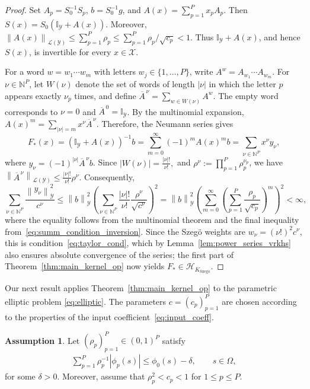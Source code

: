 \documentclass[11pt]{article}
\numberwithin{equation}{section}
\theoremstyle{plain}
\theoremstyle{definition}
\newtheorem{assumption}[theorem]{Assumption}
\theoremstyle{remark}
\newcommand{\X}{\mathcal{X}}
\newcommand{\Hs}{\mathcal{H}}
\newcommand{\Y}{\mathcal{Y}}
\newcommand{\I}{\mathbb{I}}
\newcommand{\norm}[1]{\left\lVert#1\right\rVert}
\newcommand{\abs}[1]{\left|#1\right|}
\begin{document}
\begin{proof}
Set
$A_p=S_0^{-1}S_p$, $b=S_0^{-1}g$, and $A(x)=\sum_{p=1}^P x_pA_p$.
Then
$S(x)=S_0(\I_{\Y}+A(x))$.
Moreover,
$\norm{A(x)}_{\mathcal{L}(\Y)}\leq\sum_{p=1}^P\rho_p\leq\sum_{p=1}^P\rho_p/\sqrt{c_p}<1$.
Thus $\I_{\Y}+A(x)$, and hence $S(x)$, is invertible for every
$x\in\X$.

For a word $w=w_1\cdots w_m$ with letters
$w_j\in\{1,\ldots,P\}$, write
$A^w=A_{w_1}\cdots A_{w_m}$.
For $\nu\in\mathbb{N}^P$, let $W(\nu)$ denote the set of words of length
$|\nu|$ in which the letter $p$ appears exactly $\nu_p$ times, and define
$\overline{A}^{\,\nu}=\sum_{w\in W(\nu)}A^w$.
The empty word corresponds to $\nu=0$ and
$\overline{A}^{\,0}=\I_{\Y}$. By the multinomial expansion,
$A(x)^m=\sum_{|\nu|=m}x^\nu\overline{A}^{\,\nu}$.
Therefore, the Neumann series gives
$$
F_*(x)
=
(\I_{\Y}+A(x))^{-1}b=
\sum_{m=0}^\infty(-1)^mA(x)^m b
=
\sum_{\nu\in\mathbb{N}^P}
x^\nu y_\nu,
$$
where
\(
y_\nu=(-1)^{|\nu|}\overline{A}^{\,\nu}b
\).
Since
\(
|W(\nu)|=\frac{|\nu|!}{\nu!},
\)
and $\rho^\nu:=\prod_{p=1}^P\rho_p^{\nu_p}$, we have
\(
\norm{\overline{A}^{\,\nu}}_{\mathcal{L}(\Y)}
\leq
\frac{|\nu|!}{\nu!}\rho^\nu.
\)
Consequently,
$$
\sum_{\nu\in\mathbb{N}^P}
\frac{\norm{y_\nu}_{\Y}^{2}}{c^\nu}
\leq
\norm{b}_{\Y}^{2}
\left(
\sum_{\nu\in\mathbb{N}^P}
\frac{|\nu|!}{\nu!}
\frac{\rho^\nu}{\sqrt{c^\nu}}
\right)^2
=
\norm{b}_{\Y}^{2}
\left(
\sum_{m=0}^\infty
\left(
\sum_{p=1}^P
\frac{\rho_p}{\sqrt{c_p}}
\right)^m
\right)^2
<\infty,
$$
where the equality follows from the multinomial theorem and the final
inequality from~\eqref{eq:summ_condition_inversion}. Since the Szegö weights are $w_\nu=(\nu!)^2c^\nu$, this is
condition~\eqref{eq:taylor_cond}, which by Lemma~\ref{lem:power_series_vrkhs}
also ensures absolute convergence of the series; the first part of
Theorem~\ref{thm:main_kernel_op} now yields
$F_*\in\Hs_{K_{\mathrm{Szeg\ddot{o}}}}$.
\end{proof}

Our next result applies Theorem~\ref{thm:main_kernel_op} to the parametric elliptic problem
\eqref{eq:elliptic}. The parameters
$c=(c_p)_{p=1}^P$ are chosen according to the properties of the input
coefficient~\eqref{eq:input_coeff}.

\begin{assumption}\label{as:pde_szeg}
Let $(\rho_p)_{p=1}^P\in(0,1)^P$ satisfy
\begin{align}\label{eq:def_delta_admissible}
\sum_{p=1}^P\rho_p^{-1}\abs{\phi_p(s)}
\leq \phi_0(s)-\delta,
\qquad s\in\Omega,
\end{align}
for some $\delta>0$. Moreover, assume that
$\rho_p^2<c_p<1$ for $1\leq p\leq P$.
\end{assumption}
\end{document}
